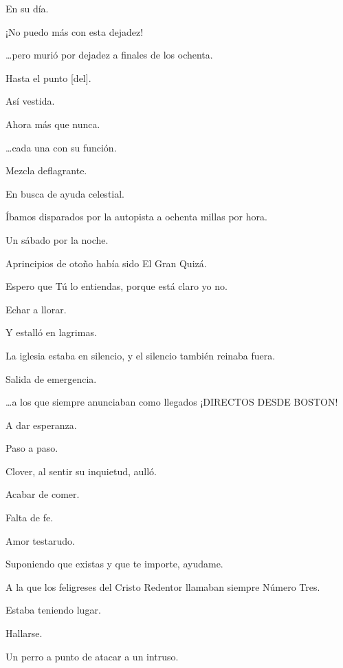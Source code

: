 \sk
En su día. 

\sk
¡No puedo más con esta dejadez!

\sk
\ldots{}pero murió por dejadez a finales de los ochenta.  

\sk
Hasta el punto [del]. 

\sk
Así vestida. 

\sk
Ahora más que nunca. 

\sk
\ldots{}cada una con su función.

\sk
Mezcla deflagrante. 

\sk
En busca de ayuda celestial.

\sk
Íbamos disparados por la autopista a ochenta millas por hora.

\sk
Un sábado por la noche.

\sk
Aprincipios de otoño había sido El Gran Quizá. 

\sk
Espero que Tú lo entiendas, porque está claro yo no.

\sk
Echar a llorar. 

\sk
Y estalló en lagrimas. 

\sk
La iglesia estaba en silencio, y el silencio también reinaba fuera.

\sk
Salida de emergencia. 

\sk
\ldots{}a los que siempre anunciaban como llegados ¡DIRECTOS DESDE BOSTON!

\sk
A dar esperanza. 

\sk
Paso a paso. 

\sk
Clover, al sentir su inquietud, aulló. 

\sk
Acabar de comer.

\sk
Falta de fe. 

\sk
Amor testarudo. 

\sk
Suponiendo que existas y que te importe, ayudame.

\sk
A la que los feligreses del Cristo Redentor llamaban siempre Número Tres.

\sk
Estaba teniendo lugar. 

\sk
Hallarse. 

\sk
Un perro a punto de atacar a un intruso.

